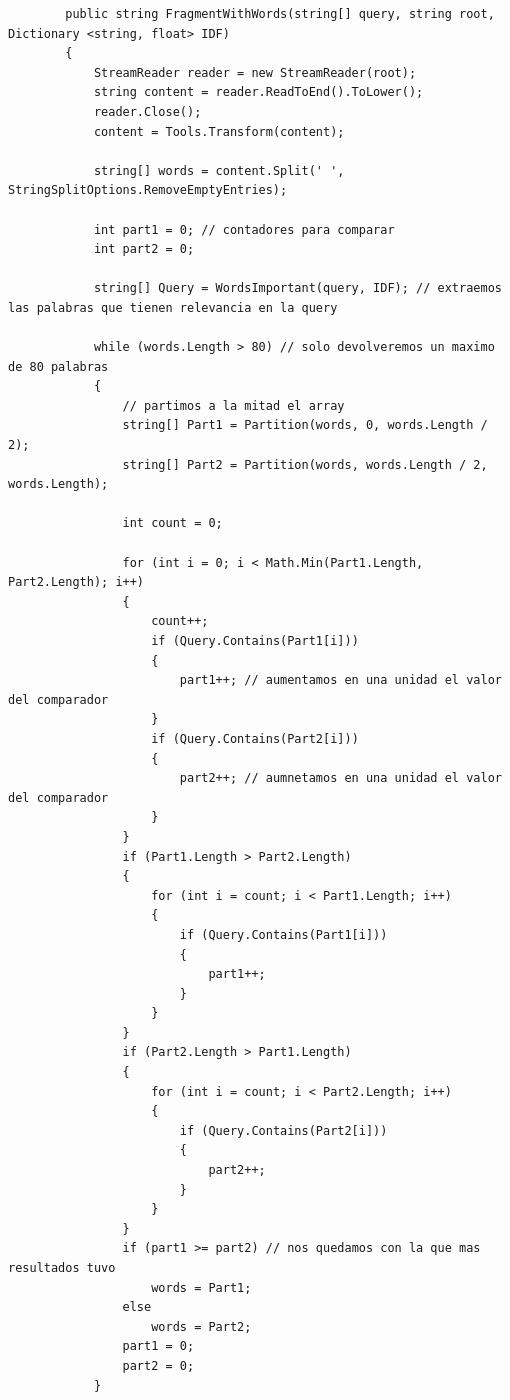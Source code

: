 \documentclass[12pt,a4paper]{report}
\begin{document}
\begin{lstlisting}
        public string FragmentWithWords(string[] query, string root, Dictionary <string, float> IDF)
        {
            StreamReader reader = new StreamReader(root);
            string content = reader.ReadToEnd().ToLower();
            reader.Close();
            content = Tools.Transform(content);

            string[] words = content.Split(' ', StringSplitOptions.RemoveEmptyEntries);

            int part1 = 0; // contadores para comparar
            int part2 = 0;

            string[] Query = WordsImportant(query, IDF); // extraemos las palabras que tienen relevancia en la query

            while (words.Length > 80) // solo devolveremos un maximo de 80 palabras
            {
                // partimos a la mitad el array
                string[] Part1 = Partition(words, 0, words.Length / 2);
                string[] Part2 = Partition(words, words.Length / 2, words.Length);

                int count = 0;

                for (int i = 0; i < Math.Min(Part1.Length, Part2.Length); i++)
                {
                    count++;
                    if (Query.Contains(Part1[i]))
                    { 
                        part1++; // aumentamos en una unidad el valor del comparador
                    }
                    if (Query.Contains(Part2[i]))
                    {
                        part2++; // aumnetamos en una unidad el valor del comparador
                    }
                }
                if (Part1.Length > Part2.Length)
                {
                    for (int i = count; i < Part1.Length; i++)
                    {
                        if (Query.Contains(Part1[i]))
                        {
                            part1++;
                        }
                    }
                }
                if (Part2.Length > Part1.Length)
                {
                    for (int i = count; i < Part2.Length; i++)
                    {
                        if (Query.Contains(Part2[i]))
                        {
                            part2++;
                        }
                    }
                }
                if (part1 >= part2) // nos quedamos con la que mas resultados tuvo
                    words = Part1;
                else
                    words = Part2;
                part1 = 0;
                part2 = 0;
            }


\end{lstlisting}
\end{document}
